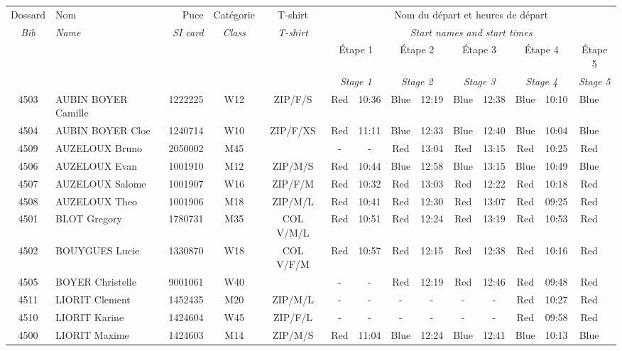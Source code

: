 \documentclass{report}
\begin{document}
  \begin{longtable}{|c|l|r|c|c|*{5}{cc|}}
    Dossard & Nom  & Puce    & Catégorie & T-shirt & \multicolumn{10}{c|}{Nom du départ et heures de départ} \\
    \itshape Bib     & \itshape Name & \itshape SI card & \itshape Class  & \itshape  T-shirt  & \multicolumn{10}{c|}{\itshape Start names and start times} \\
    \hline
    & & & & & \multicolumn{2}{c|}{Étape 1} & \multicolumn{2}{c|}{Étape 2} & \multicolumn{2}{c|}{Étape 3} & \multicolumn{2}{c|}{Étape 4} & \multicolumn{2}{c|}{Étape 5} \\
    & & & & & \multicolumn{2}{c|}{\itshape Stage 1} & \multicolumn{2}{c|}{\itshape Stage 2} & \multicolumn{2}{c|}{\itshape Stage 3} & \multicolumn{2}{c|}{\itshape Stage 4} & \multicolumn{2}{c|}{\itshape Stage 5} \\
    \hline
    4503 & AUBIN BOYER Camille & 1222225 & W12 & ZIP/F/S & Red & 10:36 & Blue & 12:19 & Blue & 12:38 & Blue & 10:10 & Blue &  \\
    4504 & AUBIN BOYER Cloe & 1240714 & W10 & ZIP/F/XS & Red & 11:11 & Blue & 12:33 & Blue & 12:40 & Blue & 10:04 & Blue &  \\
    4509 & AUZELOUX Bruno & 2050002 & M45 &   & - &  - & Red & 13:04 & Red & 13:15 & Red & 10:25 & Red &  \\
    4506 & AUZELOUX Evan & 1001910 & M12 & ZIP/M/S & Red & 10:44 & Blue & 12:58 & Blue & 13:15 & Blue & 10:49 & Blue &  \\
    4507 & AUZELOUX Salome & 1001907 & W16 & ZIP/F/M & Red & 10:32 & Red & 13:03 & Red & 12:22 & Red & 10:18 & Red &  \\
    4508 & AUZELOUX Theo & 1001906 & M18 & ZIP/M/L & Red & 10:41 & Red & 12:30 & Red & 13:07 & Red & 09:25 & Red &  \\
    4501 & BLOT Gregory & 1780731 & M35 & COL V/M/L & Red & 10:51 & Red & 12:24 & Red & 13:19 & Red & 10:53 & Red &  \\
    4502 & BOUYGUES Lucie & 1330870 & W18 & COL V/F/M & Red & 10:57 & Red & 12:15 & Red & 12:38 & Red & 10:16 & Red &  \\
    4505 & BOYER Christelle & 9001061 & W40 &   & - &  - & Red & 12:19 & Red & 12:46 & Red & 09:48 & Red &  \\
    4511 & LIORIT Clement & 1452435 & M20 & ZIP/M/L & - &  - & - &  - & - &  - & Red & 10:27 & Red &  \\
    4510 & LIORIT Karine & 1424604 & W45 & ZIP/F/L & - &  - & - &  - & - &  - & Red & 09:58 & Red &  \\
    4500 & LIORIT Maxime & 1424603 & M14 & ZIP/M/S & Red & 11:04 & Blue & 12:24 & Blue & 12:41 & Blue & 10:13 & Blue &  \\
  \end{longtable}
\end{document}
